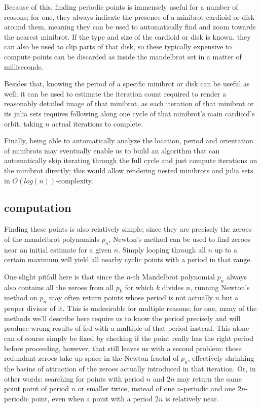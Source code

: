 \documentclass[12pt,a4paper]{article}
\begin{document}
Because of this, finding periodic points is immensely useful for a number of reasons; for one, they always indicate the presence of a minibrot cardioid or disk around them, meaning they can be used to automatically find and zoom towards the nearest minibrot. If the type and size of the cardioid or disk is known, they can also be used to clip parts of that disk, so these typically expensive to compute points can be discarded as inside the mandelbrot set in a matter of milliseconds.

Besides that, knowing the period of a specific minibrot or disk can be useful as well; it can be used to estimate the iteration count required to render a reasonably detailed image of that minibrot, as each iteration of that minibrot or its julia sets requires following along one cycle of that minibrot's main cardioid's orbit, taking $n$ actual iterations to complete.

Finally, being able to automatically analyze the location, period and orientation of minibrots may eventually enable us to build an algorithm that can automatically skip iterating through the full cycle and just compute iterations on the minibrot directly; this would allow rendering nested minibrots and julia sets in $O(log(n))$-complexity.

\subsection{computation}

Finding these points is also relatively simple; since they are precisely the zeroes of the mandelbrot polynomials $p_n$, Newton's method can be used to find zeroes near an initial estimate for a given $n$. Simply looping through all $n$ up to a certain maximum will yield all nearby cyclic points with a period in that range.

One slight pitfall here is that since the $n$-th Mandelbrot polynomial $p_n$ always also contains all the zeroes from all $p_k$ for which $k$ divides $n$, running Newton's method on $p_n$ may often return points whose period is not actually $n$ but a proper divisor of it. This is undesirable for multiple reasons; for one, many of the methods we'll describe here require us to know the period precisely and will produce wrong results of fed with a multiple of that period instead. This alone can of course simply be fixed by checking if the point really has the right period before proceeding, however, that still leaves us with a second problem: those redundant zeroes take up space in the Newton fractal of $p_n$, effectively shrinking the basins of attraction of the zeroes actually introduced in that iteration. Or, in other words: searching for points with period $n$ and $2n$ may return the same point point of period $n$ or smaller twice, instead of one $n$-periodic and one $2n$-periodic point, even when a point with a period $2n$ is relatively near.
\end{document}
